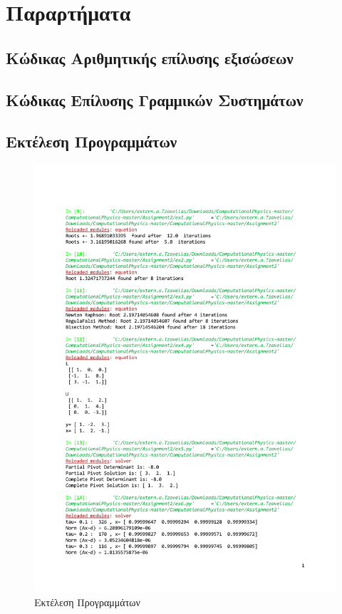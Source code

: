 \documentclass[assignment2.tex]{subfiles}
\begin{document}
\section*{Παραρτήματα}
\subsection*{Κώδικας Αριθμητικής επίλυσης εξισώσεων}


\subsection*{Κώδικας Επίλυσης Γραμμικών Συστημάτων}


\subsection*{Εκτέλεση Προγραμμάτων}
\begin{figure}[hp]
	\includegraphics[width=\textwidth]{run.pdf}
	\centering
	\caption{Εκτέλεση Προγραμμάτων}
	\label{fig:run}
\end{figure}
\end{document}

